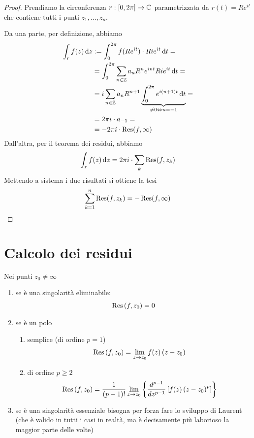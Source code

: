 \begin{proof}
Prendiamo la circonferenza $r:[0,2\pi]\to\mathbb{C}$ parametrizzata da $r(t)=Re^{it}$ che contiene tutti i punti $z_1,\dotsc,z_n$. 

Da una parte, per definizione, abbiamo
\begin{align*}
\int_r f(z)\, \mathrm{d} z&:=\int_0^{2\pi} f(Re^{it})\cdot Rie^{it}\, \mathrm{d} t =\\
&=\int_0^{2\pi} \sum_{n\in\mathbb{Z}} a_n R^ne^{int}Rie^{it}\, \mathrm{d} t =\\
&=i\sum_{n\in\mathbb{Z}}a_nR^{n+1}\underbrace{\int_0^{2\pi}e^{i(n+1)t}\, \mathrm{d} t}_{\neq 0\Leftrightarrow n=-1} =\\
&=2\pi i \cdot a_{-1} =\\
&=-2\pi i\cdot \operatorname{Res}(f,\infty)
\end{align*}
Dall'altra, per il teorema dei residui, abbiamo
\begin{equation*}
\int_r f(z)\, \mathrm{d} z=2\pi i\cdot \sum_k\operatorname{Res}(f,z_k)
\end{equation*}
Mettendo a sistema i due risultati si ottiene la tesi
$$
\sum\limits^{n}_{k = 1}\operatorname{Res} (f, z_{k}) = - \operatorname{Res} (f, \infty)
$$
\end{proof}

\section{Calcolo dei residui}

Nei punti $z_{0} \neq \infty $
\begin{enumerate}
\item se è una singolarità eliminabile:
\begin{equation*}
\operatorname{Res} \left(f, z_{0}\right) = 0
\end{equation*}
\item se è un polo
\begin{enumerate}
\item semplice (di ordine $p = 1$)
\begin{equation*}
\operatorname{Res} \left(f, z_{0}\right) = \lim\limits_{z\rightarrow z_{0}} f(z)\left(z - z_{0}\right)
\end{equation*}
\item di ordine $p \geq 2$
\begin{equation*}
\operatorname{Res} \left(f, z_{0}\right) = \frac{1}{\left(p - 1\right) !}\lim\limits_{z\rightarrow z_{0}}\left\{\frac{d^{p - 1}}{dz^{p - 1}}\left[ f(z)\left(z - z_{0}\right)^{p}\right]\right\}
\end{equation*}
\end{enumerate}
\item se è una singolarità essenziale bisogna per forza fare lo sviluppo di Laurent (che è valido in tutti i casi in realtà, ma è decisamente più laborioso la maggior parte delle volte)
\end{enumerate}

